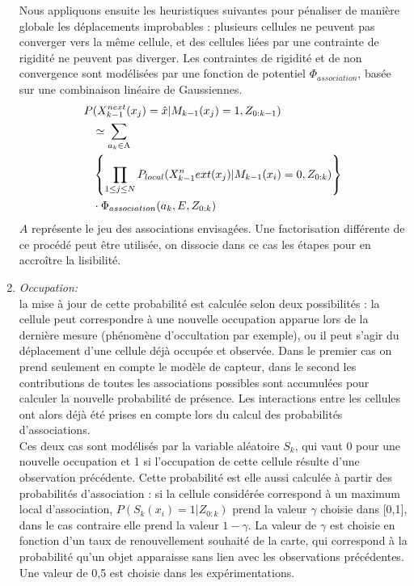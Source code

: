 \begin{enumerate}
	Nous appliquons ensuite les heuristiques suivantes pour pénaliser de manière globale les déplacements improbables : plusieurs cellules ne peuvent pas converger vers la même cellule, et des cellules liées par une contrainte de rigidité ne peuvent pas diverger. Les contraintes de rigidité et de non convergence sont modélisées par une fonction de potentiel $\Phi_{association}$, basée sur une combinaison linéaire de Gaussiennes.
	\begin{align}
		P &(X_{k-1}^{next}(x_j) = \hat{x} |  M_{k-1}(x_j)=1,  Z_{0:k-1} ) \notag \\
		&\simeq  \sum_{a_k \in \rm{A} } \notag \\
		&\left\lbrace   \prod_{1 \leq j \leq N} P_{local}(X_{k-1}^next(x_j) | M_{k-1}(x_i)=0, Z_{0:k}) \right\rbrace \notag \\ 
		&\cdot \Phi_{association} (a_k, E, Z_{0:k}) 
	\end{align}
	$A$ représente le jeu des associations envisagées. Une factorisation différente de ce procédé peut être utilisée, on dissocie dans ce cas les étapes pour en accroître la lisibilité.\\
	
	\item{\emph{Occupation:\\}}
	la mise à jour de cette probabilité est calculée selon deux possibilités : la cellule peut correspondre à une nouvelle occupation apparue lors de la dernière mesure (phénomène d'occultation par exemple), ou il peut s'agir du déplacement d'une cellule déjà occupée et observée. Dans le premier cas on prend seulement en compte le modèle de capteur, dans le second les contributions de toutes les associations possibles sont accumulées pour calculer la nouvelle probabilité de présence. Les interactions entre les cellules ont alors déjà été prises en compte lors du calcul des probabilités d'associations.\\
	Ces deux cas sont modélisés par la variable aléatoire $S_k$, qui vaut 0 pour une \og nouvelle\fg{} occupation et 1 si l'occupation de cette cellule résulte d'une observation précédente. Cette probabilité est elle aussi calculée à partir des probabilités d'association : si la cellule considérée correspond à un maximum local d'association, $P(S_k(x_i)=1 | Z_{0:k})$ prend la valeur $\gamma$  choisie dans [0,1], dans le cas contraire elle prend la valeur $1 - \gamma$. La valeur de $\gamma$ est choisie en fonction d'un \og taux de renouvellement\fg{} souhaité de la carte, qui correspond à la probabilité qu'un objet apparaisse sans lien avec les observations précédentes. Une valeur de 0,5 est choisie dans les expérimentations.
	

\end{enumerate}
